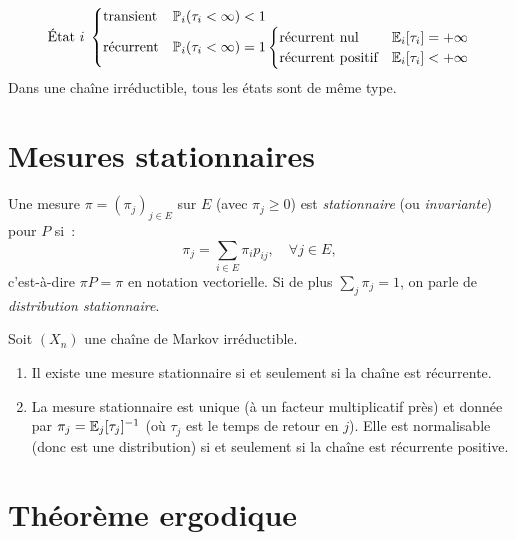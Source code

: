 \begin{formules}[title=\textbf{Classification des \'etats}]
\[
\text{\'Etat } i \;\begin{cases}
  \text{transient} & \mathbb{P}_i(\tau_i < \infty) < 1 \\
  \text{r\'ecurrent} & \mathbb{P}_i(\tau_i < \infty) = 1
    \begin{cases}
      \text{r\'ecurrent nul} & \mathbb{E}_i[\tau_i] = +\infty \\
      \text{r\'ecurrent positif} & \mathbb{E}_i[\tau_i] < +\infty
    \end{cases}
\end{cases}
\]
Dans une cha\^ine irr\'eductible, tous les \'etats sont de m\^eme type.
\end{formules}

\section{Mesures stationnaires}

\begin{definition}
Une mesure $\pi = (\pi_j)_{j \in E}$ sur $E$ (avec $\pi_j \geq 0$) est
\emph{stationnaire} (ou \emph{invariante}) pour $P$ si~:
\[
  \pi_j = \sum_{i \in E} \pi_i p_{ij}, \quad \forall j \in E,
\]
c'est-\`a-dire $\pi P = \pi$ en notation vectorielle. Si de plus
$\sum_j \pi_j = 1$, on parle de \emph{distribution stationnaire}.
\end{definition}

\begin{theoreme}
\label{thm:stat_uniq}
Soit $(X_n)$ une cha\^ine de Markov irr\'eductible.
\begin{enumerate}
  \item Il existe une mesure stationnaire si et seulement si la cha\^ine est
    r\'ecurrente.
  \item La mesure stationnaire est unique (\`a un facteur multiplicatif pr\`es)
    et donn\'ee par $\pi_j = \mathbb{E}_j[\tau_j]^{-1}$ (o\`u $\tau_j$ est le temps de
    retour en $j$). Elle est normalisable (donc est une distribution) si et
    seulement si la cha\^ine est r\'ecurrente positive.
\end{enumerate}
\end{theoreme}

\section{Th\'eor\`eme ergodique}

